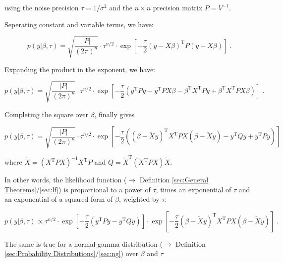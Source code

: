 \documentclass[a4paper,12pt,twoside]{book}
\begin{document}
using the noise precision $\tau = 1/\sigma^2$ and the $n \times n$ precision matrix $P = V^{-1}$.

\vspace{1em}
Seperating constant and variable terms, we have:

\begin{equation} \label{eq:blr-prior-GLM-LF-s1}
p(y|\beta,\tau) = \sqrt{\frac{|P|}{(2 \pi)^n}} \cdot \tau^{n/2} \cdot \exp\left[ -\frac{\tau}{2} (y-X\beta)^\mathrm{T} P (y-X\beta) \right] \; .
\end{equation}

Expanding the product in the exponent, we have:

\begin{equation} \label{eq:blr-prior-GLM-LF-s2}
p(y|\beta,\tau) = \sqrt{\frac{|P|}{(2 \pi)^n}} \cdot \tau^{n/2} \cdot \exp\left[ -\frac{\tau}{2} \left( y^\mathrm{T} P y - y^\mathrm{T} P X \beta - \beta^\mathrm{T} X^\mathrm{T} P y + \beta^\mathrm{T} X^\mathrm{T} P X \beta \right) \right] \; .
\end{equation}

Completing the square over $\beta$, finally gives

\begin{equation} \label{eq:blr-prior-GLM-LF-s3}
p(y|\beta,\tau) = \sqrt{\frac{|P|}{(2 \pi)^n}} \cdot \tau^{n/2} \cdot \exp\left[ -\frac{\tau}{2} \left( (\beta - \tilde{X}y)^\mathrm{T} X^\mathrm{T} P X (\beta - \tilde{X}y) - y^\mathrm{T} Q y + y^\mathrm{T} P y \right) \right]
\end{equation}

where $\tilde{X} = \left( X^\mathrm{T} P X \right)^{-1} X^\mathrm{T} P$ and $Q = \tilde{X}^\mathrm{T} \left( X^\mathrm{T} P X \right) \tilde{X}$.

\vspace{1em}
In other words, the likelihood function ($\rightarrow$ Definition \ref{sec:General Theorems}/\ref{sec:lf}) is proportional to a power of $\tau$, times an exponential of $\tau$ and an exponential of a squared form of $\beta$, weighted by $\tau$:

\begin{equation} \label{eq:blr-prior-GLM-LF-s4}
p(y|\beta,\tau) \propto \tau^{n/2} \cdot \exp\left[ -\frac{\tau}{2} \left( y^\mathrm{T} P y - y^\mathrm{T} Q y \right) \right] \cdot \exp\left[ -\frac{\tau}{2} (\beta - \tilde{X}y)^\mathrm{T} X^\mathrm{T} P X (\beta - \tilde{X}y) \right] \; .
\end{equation}

The same is true for a normal-gamma distribution ($\rightarrow$ Definition \ref{sec:Probability Distributions}/\ref{sec:ng}) over $\beta$ and $\tau$
\end{document}
